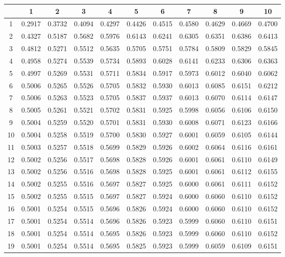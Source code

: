 \begin{tabular}{|c|c|c|c|c|c|c|c|c|c|c|}
\hline 
 &1 &2 &3 &4 &5 &6 &7 &8 &9 &10 \\
 \hline 
1 &0.2917 &0.3732 &0.4094 &0.4297 &0.4426 &0.4515 &0.4580 &0.4629 &0.4669 &0.4700 \\
 \hline 
2 &0.4327 &0.5187 &0.5682 &0.5976 &0.6143 &0.6241 &0.6305 &0.6351 &0.6386 &0.6413 \\
 \hline 
3 &0.4812 &0.5271 &0.5512 &0.5635 &0.5705 &0.5751 &0.5784 &0.5809 &0.5829 &0.5845 \\
 \hline 
4 &0.4958 &0.5274 &0.5539 &0.5734 &0.5893 &0.6028 &0.6141 &0.6233 &0.6306 &0.6363 \\
 \hline 
5 &0.4997 &0.5269 &0.5531 &0.5711 &0.5834 &0.5917 &0.5973 &0.6012 &0.6040 &0.6062 \\
 \hline 
6 &0.5006 &0.5265 &0.5526 &0.5705 &0.5832 &0.5930 &0.6013 &0.6085 &0.6151 &0.6212 \\
 \hline 
7 &0.5006 &0.5263 &0.5523 &0.5705 &0.5837 &0.5937 &0.6013 &0.6070 &0.6114 &0.6147 \\
 \hline 
8 &0.5005 &0.5261 &0.5521 &0.5702 &0.5831 &0.5925 &0.5998 &0.6056 &0.6106 &0.6150 \\
 \hline 
9 &0.5004 &0.5259 &0.5520 &0.5701 &0.5831 &0.5930 &0.6008 &0.6071 &0.6123 &0.6166 \\
 \hline 
10 &0.5004 &0.5258 &0.5519 &0.5700 &0.5830 &0.5927 &0.6001 &0.6059 &0.6105 &0.6144 \\
 \hline 
11 &0.5003 &0.5257 &0.5518 &0.5699 &0.5829 &0.5926 &0.6002 &0.6064 &0.6116 &0.6161 \\
 \hline 
12 &0.5002 &0.5256 &0.5517 &0.5698 &0.5828 &0.5926 &0.6001 &0.6061 &0.6110 &0.6149 \\
 \hline 
13 &0.5002 &0.5256 &0.5516 &0.5698 &0.5828 &0.5925 &0.6001 &0.6061 &0.6112 &0.6155 \\
 \hline 
14 &0.5002 &0.5255 &0.5516 &0.5697 &0.5827 &0.5925 &0.6000 &0.6061 &0.6111 &0.6152 \\
 \hline 
15 &0.5002 &0.5255 &0.5515 &0.5697 &0.5827 &0.5924 &0.6000 &0.6060 &0.6110 &0.6152 \\
 \hline 
16 &0.5001 &0.5254 &0.5515 &0.5696 &0.5826 &0.5924 &0.6000 &0.6060 &0.6110 &0.6152 \\
 \hline 
17 &0.5001 &0.5254 &0.5514 &0.5696 &0.5826 &0.5923 &0.5999 &0.6060 &0.6110 &0.6151 \\
 \hline 
18 &0.5001 &0.5254 &0.5514 &0.5695 &0.5826 &0.5923 &0.5999 &0.6060 &0.6110 &0.6152 \\
 \hline 
19 &0.5001 &0.5254 &0.5514 &0.5695 &0.5825 &0.5923 &0.5999 &0.6059 &0.6109 &0.6151 \\

\end{tabular}
